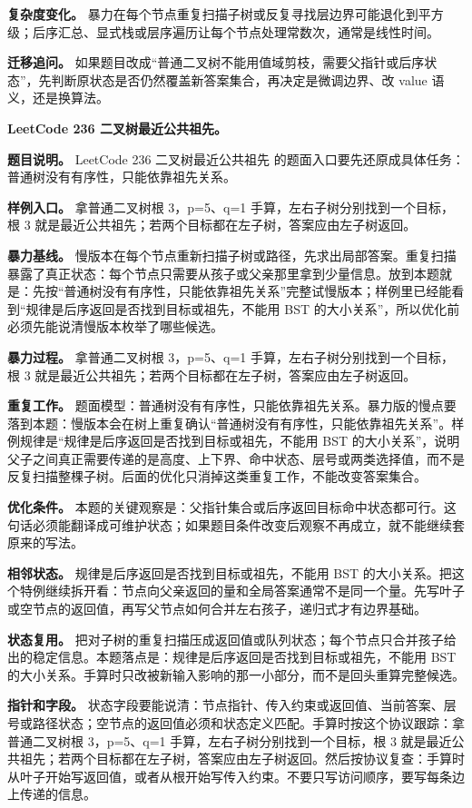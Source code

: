 \textbf{复杂度变化。} 暴力在每个节点重复扫描子树或反复寻找层边界可能退化到平方级；后序汇总、显式栈或层序遍历让每个节点处理常数次，通常是线性时间。

\textbf{迁移追问。} 如果题目改成“普通二叉树不能用值域剪枝，需要父指针或后序状态”，先判断原状态是否仍然覆盖新答案集合，再决定是微调边界、改 value 语义，还是换算法。

\noindent\textbf{LeetCode 236 二叉树最近公共祖先。}

\textbf{题目说明。} LeetCode 236 二叉树最近公共祖先 的题面入口要先还原成具体任务：普通树没有有序性，只能依靠祖先关系。

\textbf{样例入口。} 拿普通二叉树根 3，p=5、q=1 手算，左右子树分别找到一个目标，根 3 就是最近公共祖先；若两个目标都在左子树，答案应由左子树返回。

\textbf{暴力基线。} 慢版本在每个节点重新扫描子树或路径，先求出局部答案。重复扫描暴露了真正状态：每个节点只需要从孩子或父亲那里拿到少量信息。放到本题就是：先按“普通树没有有序性，只能依靠祖先关系”完整试慢版本；样例里已经能看到“规律是后序返回是否找到目标或祖先，不能用 BST 的大小关系”，所以优化前必须先能说清慢版本枚举了哪些候选。

\textbf{暴力过程。} 拿普通二叉树根 3，p=5、q=1 手算，左右子树分别找到一个目标，根 3 就是最近公共祖先；若两个目标都在左子树，答案应由左子树返回。

\textbf{重复工作。} 题面模型：普通树没有有序性，只能依靠祖先关系。暴力版的慢点要落到本题：慢版本会在树上重复确认“普通树没有有序性，只能依靠祖先关系”。样例规律是“规律是后序返回是否找到目标或祖先，不能用 BST 的大小关系”，说明父子之间真正需要传递的是高度、上下界、命中状态、层号或两类选择值，而不是反复扫描整棵子树。后面的优化只消掉这类重复工作，不能改变答案集合。

\textbf{优化条件。} 本题的关键观察是：父指针集合或后序返回目标命中状态都可行。这句话必须能翻译成可维护状态；如果题目条件改变后观察不再成立，就不能继续套原来的写法。

\textbf{相邻状态。} 规律是后序返回是否找到目标或祖先，不能用 BST 的大小关系。把这个特例继续拆开看：节点向父亲返回的量和全局答案通常不是同一个量。先写叶子或空节点的返回值，再写父节点如何合并左右孩子，递归式才有边界基础。

\textbf{状态复用。} 把对子树的重复扫描压成返回值或队列状态；每个节点只合并孩子给出的稳定信息。本题落点是：规律是后序返回是否找到目标或祖先，不能用 BST 的大小关系。手算时只改被新输入影响的那一小部分，而不是回头重算完整候选。

\textbf{指针和字段。} 状态字段要能说清：节点指针、传入约束或返回值、当前答案、层号或路径状态；空节点的返回值必须和状态定义匹配。手算时按这个协议跟踪：拿普通二叉树根 3，p=5、q=1 手算，左右子树分别找到一个目标，根 3 就是最近公共祖先；若两个目标都在左子树，答案应由左子树返回。然后按协议复查：手算时从叶子开始写返回值，或者从根开始写传入约束。不要只写访问顺序，要写每条边上传递的信息。

